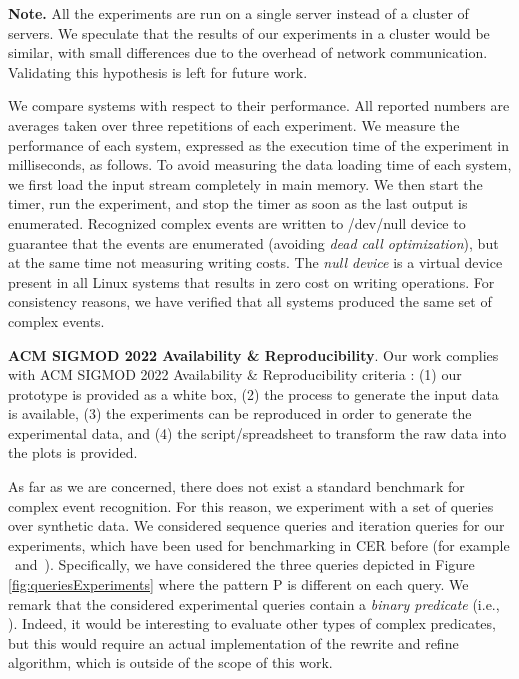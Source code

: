 \textbf{Note.} All the experiments are run on a single server instead of a cluster of servers. We speculate that the results of our experiments in a cluster would be similar, with small differences due to the overhead of network communication. Validating this hypothesis is left for future work.

We compare systems with respect to their performance. All reported numbers are averages taken over three repetitions of each experiment. We measure the performance of each system, expressed as the execution time of the experiment in milliseconds, as follows. To avoid measuring the data loading time of each system, we first load the input stream completely in main memory. We then start the timer, run the experiment, and stop the timer as soon as the last output is enumerated. Recognized complex events are written to /dev/null device to guarantee that the events are enumerated (avoiding \emph{dead call optimization}), but at the same time not measuring writing costs. The \emph{null device} is a virtual device present in all Linux systems that results in zero cost on writing operations. For consistency reasons, we have verified that all systems produced the same set of complex events.

\textbf{ACM SIGMOD 2022 Availability \& Reproducibility}. Our work complies with ACM SIGMOD 2022 Availability \& Reproducibility criteria \cite{acm-reprodocubility} : (1) our prototype is provided as a white box, (2) the process to generate the input data is available, (3) the experiments can be reproduced in order to generate the experimental data, and (4) the script/spreadsheet to transform the raw data into the plots is provided.

As far as we are concerned, there does not exist a standard benchmark for complex event recognition. For this reason, we experiment with a set of queries over synthetic data. We considered sequence queries and iteration queries for our experiments, which have been used for benchmarking in CER before (for example \cite{cayuga}~and~\cite{experiment-example}). Specifically, we have considered the three queries depicted in Figure \ref{fig:queriesExperiments} where the pattern \textrm{P} is different on each query. We remark that the considered experimental queries contain a \emph{binary predicate} (i.e., ). Indeed, it would be interesting to evaluate other types of complex predicates, but this would require an actual implementation of the rewrite and refine algorithm, which is outside of the scope of this work. 

